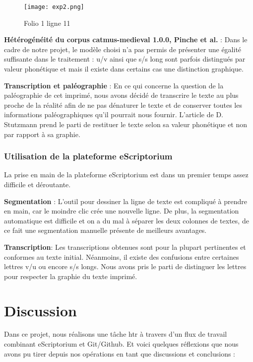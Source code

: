\documentclass[12pt]{article}
\begin{document}
\begin{figure}
\centering
\texttt{[image: exp2.png]}
\caption{\label{exp2.png}Folio 1 ligne 11}
\end{figure}

\textbf{Hétérogénéité du corpus \acrshort{catmus-medieval} 1.0.0, Pinche et al.} : Dans le cadre de notre projet, le modèle choisi n’a pas permis de présenter une égalité suffisante dans le traitement : u/v ainsi que s/s long sont parfois distingués par valeur phonétique et mais il existe dans certains cas une distinction graphique. 

\textbf{Transcription et paléographie} : En ce qui concerne la question de la paléographie de cet imprimé, nous avons décidé de transcrire le texte au plus proche de la réalité afin de ne pas dénaturer le texte et de conserver toutes les informations paléographiques qu’il pourrait nous fournir. L’article de D. Stutzmann prend le parti de restituer le texte selon sa valeur phonétique et non par rapport à sa graphie.

\subsubsection{Utilisation de la plateforme eScriptorium}
La prise en main de la plateforme eScriptorium est dans un premier temps assez difficile et déroutante. 

\textbf{Segmentation} : L’outil pour dessiner la ligne de texte est compliqué à prendre en main, car le moindre clic crée une nouvelle ligne. De plus, la segmentation automatique est difficile et on a du mal à séparer les deux colonnes de textes, de ce fait une segmentation manuelle présente de meilleurs avantages.  

\textbf{Transcription}: Les transcriptions obtenues sont pour la plupart pertinentes et conformes au texte initial. Néanmoins, il existe des confusions entre certaines lettres v/u ou encore s/s longs. Nous avons pris le parti de distinguer les lettres pour respecter la graphie du texte imprimé. 




\section{Discussion}
Dans ce projet, nous réalisons une tâche \acrshort{htr} à travers d’un flux de travail combinant eScriptorium et Git/Github. Et voici quelques réflexions que nous avons pu tirer depuis nos opérations en tant que discussions et conclusions :
\end{document}
